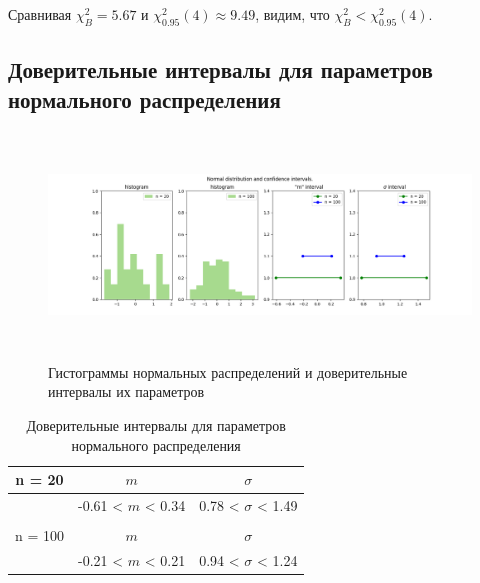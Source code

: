 \documentclass[a4paper]{article}
\begin{document}
\noindent Сравнивая $\chi^{2}_{B} = 5.67$ и $\chi^{2}_{0.95}(4) \approx 9.49$, видим, что $\chi^{2}_{B} < \chi^{2}_{0.95}(4)$.

\subsection{Доверительные интервалы для параметров нормального распределения}
    \begin{figure}[H]
		\centering
		    \includegraphics[width = 18cm, height = 6cm]{./lab2_4/pictures/norm.png}
		\caption{Гистограммы нормальных распределений и доверительные интервалы их параметров}
		\label{w_pert}
	\end{figure}
		
	\begin{table}[H]
	    \centering
	    \begin{tabular}{| c | c | c |}
	    \hline
	       n = 20   &  $m$  & $\sigma$\\ \hline
	          &  -0.61 < $m$ < 0.34 & 0.78 < $\sigma$ < 1.49 \\ \hline
	         &   &   \\ \hline
	       n = 100   &  $m$  & $\sigma$\\ \hline
	        & -0.21 < $m$ < 0.21 & 0.94 < $\sigma$ < 1.24 \\
	   \hline
	    \end{tabular}
	    \caption{Доверительные интервалы для параметров нормального распределения}
	    \label{tab:interv_simple}
	\end{table}
	
\end{document}
